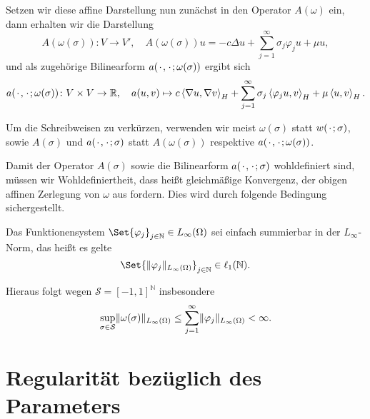 Setzen wir diese affine Darstellung nun zunächst in den Operator $A(\omega)$ ein, dann erhalten wir die Darstellung
\begin{equation}
    A(\omega(\sigma)) \colon V \to V', \quad A(\omega(\sigma)) u = -c \Delta u + \sum_{j = 1}^{\infty} \sigma_{j} \varphi_{j} u + \mu u,
\end{equation}
und als zugehörige Bilinearform $a({\mkern2mu\cdot\mkern2mu}, {\mkern2mu\cdot\mkern2mu}; \omega(\sigma))$ ergibt sich
\begin{equation}
\label{eq:pp:bf_a_sigma}
    a({\mkern2mu\cdot\mkern2mu}, {\mkern2mu\cdot\mkern2mu}; \omega(\sigma)) \colon V \times V \to \mathbb{R}, \quad a(u, v) \mapsto c\left\langle\nabla u,\nabla v\right\rangle_{H} + \sum_{j = 1}^{\infty} \sigma_{j} \left\langle\varphi_{j} u,v\right\rangle_{H} + \mu \left\langle u,v\right\rangle_{H}.
\end{equation}

\begin{Bemerkung}
    Um die Schreibweisen zu verkürzen, verwenden wir meist $\omega(\sigma)$ statt $w({\mkern2mu\cdot\mkern2mu}; \sigma)$, sowie $A(\sigma)$ und $a({\mkern2mu\cdot\mkern2mu}, {\mkern2mu\cdot\mkern2mu}; \sigma)$ statt $A(\omega(\sigma))$ respektive $a({\mkern2mu\cdot\mkern2mu}, {\mkern2mu\cdot\mkern2mu}; \omega(\sigma))$.
\end{Bemerkung}

Damit der Operator $A(\sigma)$ sowie die Bilinearform $a({\mkern2mu\cdot\mkern2mu}, {\mkern2mu\cdot\mkern2mu}; \sigma)$ wohldefiniert sind, müssen wir Wohldefiniertheit, dass heißt gleichmäßige Konvergenz, der obigen affinen Zerlegung von $\omega$ aus  fordern.
Dies wird durch folgende Bedingung sichergestellt.
\begin{Annahme}
    Das Funktionensystem $\Set{ \varphi_{j} }_{j \in \mathbb{N}} \in L_{\infty}(\Omega)$ sei einfach summierbar in der $L_{\infty}$-Norm, das heißt es gelte
    \begin{equation}
        \Set{ \norm{\varphi_{j}}_{L_{\infty}(\Omega) } }_{j \in \mathbb{N}} \in \ell_{1}(\mathbb{N}).
    \end{equation}
\end{Annahme}
Hieraus folgt wegen $\mathcal S = [-1, 1]^{\mathbb{N}}$ insbesondere
\begin{equation}
    \sup_{\sigma \in \mathcal S} \lVert\omega(\sigma)\rVert_{L_{\infty}(\Omega)} \leq \sum_{j = 1}^{\infty} \lVert\varphi_{j}\rVert_{L_{\infty}(\Omega)} < \infty.
\end{equation}


\section{Regularität bezüglich des Parameters} %
\label{sec:regularit_t_bez_glich_des_parameters}

